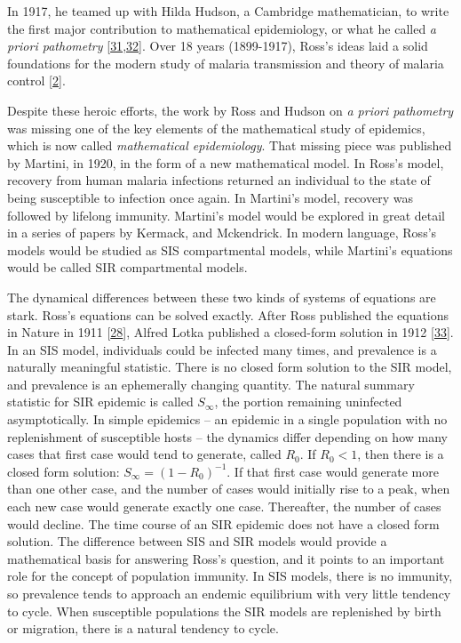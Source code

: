 \documentclass[
]{book}
\begin{document}
In 1917, he teamed up with Hilda Hudson, a Cambridge mathematician, to write the first major contribution to mathematical epidemiology, or what he called \emph{a priori pathometry} {[}\protect\hyperlink{ref-RossR1917AprioriPathometry2}{31},\protect\hyperlink{ref-RossR1917AprioriPathometry3}{32}{]}.
Over 18 years (1899-1917), Ross's ideas laid a solid foundations for the modern study of malaria transmission and theory of malaria control {[}\protect\hyperlink{ref-SmithDL2012_RossMacdonald}{2}{]}.

Despite these heroic efforts, the work by Ross and Hudson on \emph{a priori pathometry} was missing one of the key elements of the mathematical study of epidemics, which is now called \emph{mathematical epidemiology}. That missing piece was published by Martini, in 1920, in the form of a new mathematical model.
In Ross's model, recovery from human malaria infections returned an individual to the state of being susceptible to infection once again.
In Martini's model, recovery was followed by lifelong immunity.
Martini's model would be explored in great detail in a series of papers by Kermack, and Mckendrick.
In modern language, Ross's models would be studied as SIS compartmental models, while Martini's equations would be called SIR compartmental models.

The dynamical differences between these two kinds of systems of equations are stark. Ross's equations can be solved exactly.
After Ross published the equations in Nature in 1911 {[}\protect\hyperlink{ref-RossR1911Nature}{28}{]}, Alfred Lotka published a closed-form solution in 1912 {[}\protect\hyperlink{ref-LotkaAJ1912Nature}{33}{]}.
In an SIS model, individuals could be infected many times, and prevalence is a naturally meaningful statistic.
There is no closed form solution to the SIR model, and prevalence is an ephemerally changing quantity.
The natural summary statistic for SIR epidemic is called \(S_\infty\), the portion remaining uninfected asymptotically.
In simple epidemics -- an epidemic in a single population with no replenishment of susceptible hosts -- the dynamics differ depending on how many cases that first case would tend to generate, called \(R_0\).
If \(R_0 < 1\), then there is a closed form solution: \(S_\infty = (1-R_0)^{-1}\).
If that first case would generate more than one other case, and the number of cases would initially rise to a peak, when each new case would generate exactly one case.
Thereafter, the number of cases would decline.
The time course of an SIR epidemic does not have a closed form solution.
The difference between SIS and SIR models would provide a mathematical basis for answering Ross's question, and it points to an important role for the concept of population immunity.
In SIS models, there is no immunity, so prevalence tends to approach an endemic equilibrium with very little tendency to cycle.
When susceptible populations the SIR models are replenished by birth or migration, there is a natural tendency to cycle.
\end{document}
